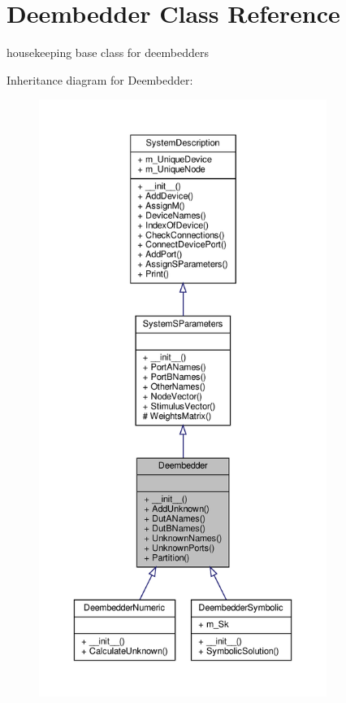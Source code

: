 \hypertarget{classSignalIntegrity_1_1SystemDescriptions_1_1Deembedder_1_1Deembedder}{}\section{Deembedder Class Reference}
\label{classSignalIntegrity_1_1SystemDescriptions_1_1Deembedder_1_1Deembedder}


housekeeping base class for deembedders  




Inheritance diagram for Deembedder\+:\nopagebreak
\begin{figure}[H]
\begin{center}
\leavevmode
\includegraphics[height=550pt]{classSignalIntegrity_1_1SystemDescriptions_1_1Deembedder_1_1Deembedder__inherit__graph}
\end{center}
\end{figure}


